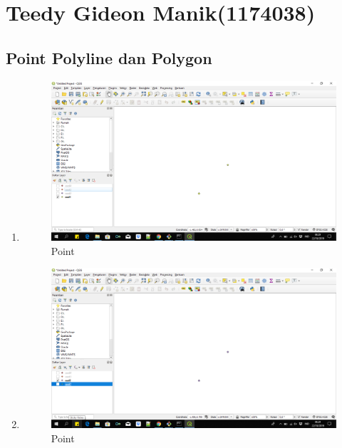 \section{Teedy Gideon Manik(1174038)}
\subsection{Point Polyline dan Polygon}
\begin{enumerate}
	\item 
	
	\begin{figure}[H]
		\includegraphics[width=12cm]{figures/1174038/1.PNG}
		\centering
		\caption{Point}
	\end{figure}
	
	\item 
	
	\begin{figure}[H]
		\includegraphics[width=12cm]{figures/1174038/2.PNG}
		\centering
		\caption{Point}
	\end{figure}
	

\end{enumerate}
